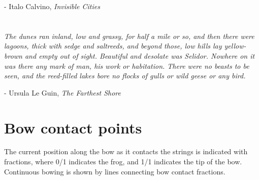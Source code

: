 \documentclass[10pt]{article}
\begin{document}
\begin{textblock}{11}
- Italo Calvino, \emph{Invisible Cities}

\section{}

\textit{The dunes ran inland, low and grassy, for half a mile or so, and then
there were lagoons, thick with sedge and saltreeds, and beyond those, low hills
lay yellow-brown and empty out of sight. Beautiful and desolate was Selidor.
Nowhere on it was there any mark of man, his work or habitation. There were no
beasts to be seen, and the reed-filled lakes bore no flocks of gulls or wild
geese or any bird. }

- Ursula Le Guin, \emph{The Farthest Shore}

\scriptsize

\section{Bow contact points}

The current position along the bow as it contacts the strings is indicated
with fractions, where 0/1 indicates the frog, and 1/1 indicates the tip of
the bow. Continuous bowing is shown by lines connecting bow contact
fractions.

\end{textblock}
\end{document}
